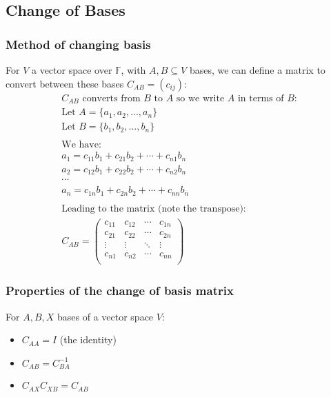 \documentclass[a4paper, 12pt, twoside]{article}
\begin{document}
\subsection{Change of Bases}

\subsubsection{Method of changing basis}

For $V$ a vector space over $\mathbb{F}$, with $A, B \subseteq V$
bases, we can define a matrix to convert between these bases 
$C_{AB} = (c_{ij})$:
\begin{gather*}
  C_{AB} \text{ converts from $B$ to $A$ so we write $A$ in terms of $B$:} \\
  \text{Let } A = \{a_1, a_2, \ldots, a_n\} \\
  \text{Let } B = \{b_1, b_2, \ldots, b_n\} \\ \\
  \text{We have:} \\
  a_1 = c_{11}b_1 + c_{21}b_2 + \cdots + c_{n1}b_n \\
  a_2 = c_{12}b_1 + c_{22}b_2 + \cdots + c_{n2}b_n \\
  \cdots \\
  a_n = c_{1n}b_1 + c_{2n}b_2 + \cdots + c_{nn}b_n \\ \\
  \text{Leading to the matrix (note the transpose):} \\
  C_{AB} = \begin{pmatrix}
    c_{11} & c_{12} & \cdots & c_{1n} \\
    c_{21} & c_{22} & \cdots & c_{2n} \\
    \vdots & \vdots & \ddots & \vdots \\
    c_{n1} & c_{n2} & \cdots & c_{nn} \\
  \end{pmatrix}
\end{gather*}

\newpage

\subsubsection{Properties of the change of basis matrix}

For $A, B, X$ bases of a vector space $V$:
\begin{itemize}
  \item $C_{AA} = I$ (the identity)
  \item $C_{AB} = C_{BA}^{-1}$
  \item $C_{AX}C_{XB} = C_{AB}$
\end{itemize}
\end{document}
